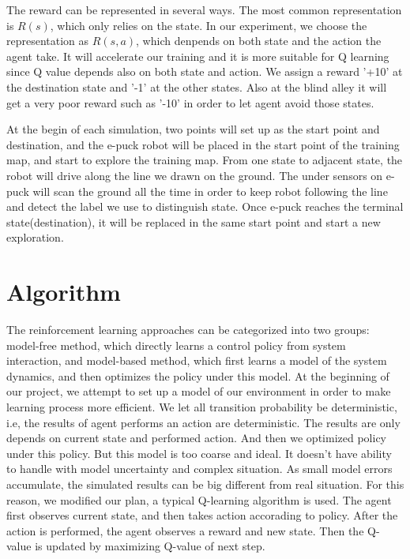 \documentclass[a4paper, 11pt]{article} %
\begin{document}
The reward can be represented in several ways. The most common representation is $R(s)$, which only relies on the state. In our experiment, we choose the representation as $R(s,a)$, which denpends on both state and the action the agent take. It will accelerate our training and it is more suitable for Q learning since Q value depends also on both state and action. We assign a reward '+10' at the destination
state and '-1' at the other states. Also at the blind alley it will get a very poor
reward such as '-10' in order to let agent avoid those states. 

At the begin of
each simulation, two points will set up as the start point and destination,
and the e-puck robot will be placed in the start point of the training map, and
start to explore the training map. From one state to adjacent state, the robot will
drive along the line we drawn on the ground. The under sensors on e-puck
will scan the ground all the time in order to keep robot following the line
and detect the label we use to distinguish state. Once e-puck reaches the terminal
state(destination), it will be replaced in the same start point and start a new exploration.

\section{Algorithm}
The reinforcement learning approaches can be categorized into two groups: model-free
method, which directly learns a control policy from system interaction, and
model-based method, which first learns a model of the system dynamics, and then
optimizes the policy under this model. At the beginning of our project, we attempt to
set up a model of our environment in order to make learning process more efficient.
We let all transition probability be deterministic, i.e, the results of agent performs
an action are deterministic. The results are only depends on current state and performed
action. And then we optimized policy under this policy. But this model is too coarse
and ideal. It doesn't have ability to handle with model uncertainty and complex situation.
As small model errors accumulate, the simulated results can be big different from
real situation. For this reason, we modified our plan, a typical Q-learning algorithm
is used. The agent first observes current state, and then takes action accorading to
policy. After the action is performed, the agent observes a reward and new state.
Then the Q-value is updated by maximizing Q-value of next step.
\end{document}

